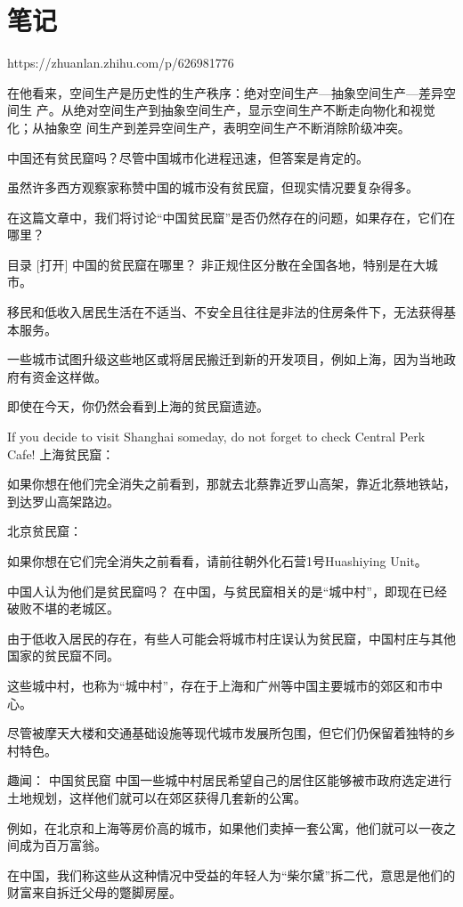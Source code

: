 \chapter{笔记}
\label{cha:notes}

https://zhuanlan.zhihu.com/p/626981776

在他看来，空间生产是历史性的生产秩序：绝对空间生产—抽象空间生产—差异空间生
产。从绝对空间生产到抽象空间生产，显示空间生产不断走向物化和视觉化；从抽象空
间生产到差异空间生产，表明空间生产不断消除阶级冲突。

中国还有贫民窟吗？尽管中国城市化进程迅速，但答案是肯定的。

虽然许多西方观察家称赞中国的城市没有贫民窟，但现实情况要复杂得多。

在这篇文章中，我们将讨论“中国贫民窟”是否仍然存在的问题，如果存在，它们在哪里？

目录
[打开]
中国的贫民窟在哪里？
非正规住区分散在全国各地，特别是在大城市。

移民和低收入居民生活在不适当、不安全且往往是非法的住房条件下，无法获得基本服务。

一些城市试图升级这些地区或将居民搬迁到新的开发项目，例如上海，因为当地政府有资金这样做。

即使在今天，你仍然会看到上海的贫民窟遗迹。

If you decide to visit Shanghai someday, do not forget to check Central Perk Cafe!
上海贫民窟：

如果你想在他们完全消失之前看到，那就去北蔡靠近罗山高架，靠近北蔡地铁站，到达罗山高架路边。

北京贫民窟：

如果你想在它们完全消失之前看看，请前往朝外化石营1号Huashiying Unit。

中国人认为他们是贫民窟吗？
在中国，与贫民窟相关的是“城中村”，即现在已经破败不堪的老城区。

由于低收入居民的存在，有些人可能会将城市村庄误认为贫民窟，中国村庄与其他国家的贫民窟不同。

这些城中村，也称为“城中村”，存在于上海和广州等中国主要城市的郊区和市中心。

尽管被摩天大楼和交通基础设施等现代城市发展所包围，但它们仍保留着独特的乡村特色。

趣闻：
中国贫民窟
中国一些城中村居民希望自己的居住区能够被市政府选定进行土地规划，这样他们就可以在郊区获得几套新的公寓。

例如，在北京和上海等房价高的城市，如果他们卖掉一套公寓，他们就可以一夜之间成为百万富翁。

在中国，我们称这些从这种情况中受益的年轻人为“柴尔黛”拆二代，意思是他们的财富来自拆迁父母的蹩脚房屋。

